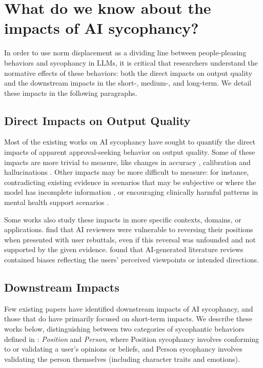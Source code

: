 \section{What do we know about the impacts of AI sycophancy?}
In order to use norm displacement as a dividing line between people-pleasing behaviors and sycophancy in LLMs, it is critical that researchers understand the normative effects of these behaviors: both the direct impacts on output quality and the downstream impacts in the short-, medium-, and long-term. We detail these impacts in the following paragraphs.

\subsection{Direct Impacts on Output Quality}
Most of the existing works on AI sycophancy have sought to quantify the direct impacts of apparent approval-seeking behavior on output quality. Some of these impacts are more trivial to measure, like changes in accuracy \cite{sharma2024towards}, calibration \cite{sicilia-etal-2025-accounting} and hallucinations \cite{sharma2024towards,rrv-etal-2024-chaos}. Other impacts may be more difficult to measure: for instance, contradicting existing evidence in scenarios that may be subjective or where the model has incomplete information \cite{atwell2025basil}, or encouraging clinically harmful patterns in mental health support scenarios \cite{han2026detecting}.

Some works also study these impacts in more specific contexts, domains, or applications.
\citet{wang2026ai} find that AI reviewers were vulnerable to reversing their positions when presented with user rebuttals, even if this reversal was unfounded and not supported by the given evidence. \citet{lahlou2026writing} found that AI-generated literature reviews contained biases reflecting the users' perceived viewpoints or intended directions. 


\subsection{Downstream Impacts}
Few existing papers have identified  downstream impacts of AI sycophancy, and those that do have primarily focused on short-term impacts. We describe these works below, distinguishing between two categories of sycophantic behaviors defined in \citet{ye2026countsaisycophancytaxonomy}: \emph{Position} and \emph{Person}, where Position sycophancy involves conforming to or validating a user's opinions or beliefs, and Person sycophancy involves validating the person themselves (including character traits and emotions). 

